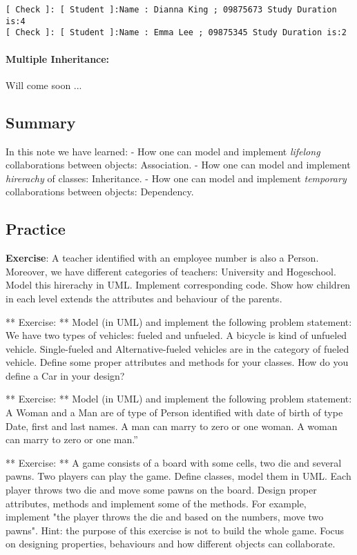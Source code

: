 \documentclass[11pt]{article}
\begin{document}
    \begin{Verbatim}[commandchars=\\\{\}]
[ Check ]: [ Student ]:Name : Dianna King ; 09875673 Study Duration is:4
[ Check ]: [ Student ]:Name : Emma Lee ; 09875345 Study Duration is:2

    \end{Verbatim}

    \paragraph{Multiple Inheritance:}\label{multiple-inheritance}

Will come soon ...

    \subsection{Summary}\label{summary}

In this note we have learned: - How one can model and implement
\emph{lifelong} collaborations between objects: Association. - How one
can model and implement \emph{hirerachy} of classes: Inheritance. - How
one can model and implement \emph{temporary} collaborations between
objects: Dependency.

    \subsection{Practice}\label{practice}

\textbf{Exercise}: A teacher identified with an employee number is also
a Person. Moreover, we have different categories of teachers: University
and Hogeschool. Model this hirerachy in UML. Implement corresponding
code. Show how children in each level extends the attributes and
behaviour of the parents.

** Exercise: ** Model (in UML) and implement the following problem
statement: We have two types of vehicles: fueled and unfueled. A bicycle
is kind of unfueled vehicle. Single-fueled and Alternative-fueled
vehicles are in the category of fueled vehicle. Define some proper
attributes and methods for your classes. How do you define a Car in your
design?

** Exercise: ** Model (in UML) and implement the following problem
statement: A Woman and a Man are of type of Person identified with date
of birth of type Date, first and last names. A man can marry to zero or
one woman. A woman can marry to zero or one man.''

** Exercise: ** A game consists of a board with some cells, two die and
several pawns. Two players can play the game. Define classes, model them
in UML. Each player throws two die and move some pawns on the board.
Design proper attributes, methods and implement some of the methods. For
example, implement "the player throws the die and based on the numbers,
move two pawns". Hint: the purpose of this exercise is not to build the
whole game. Focus on designing properties, behaviours and how different
objects can collaborate.


    
    
    
    
\end{document}
